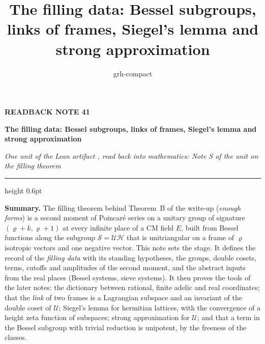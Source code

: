 \documentclass[11pt,a4paper]{article}
\title{The filling data: Bessel subgroups, links of frames, Siegel's lemma and strong approximation}
\author{grh-compact}
\date{}
\theoremstyle{plainx}
\theoremstyle{uprightx}
\begin{document}
\color{ink}

{\raggedright
{\sffamily\bfseries\fontsize{7.2}{9}\selectfont\color{leancol}READBACK NOTE 41\par}
\vspace{5pt}
{\fontsize{21.5}{25.5}\selectfont\bfseries The filling data: Bessel subgroups, links of frames, Siegel's lemma and strong
approximation\par}
\vspace{5pt}
{\fontsize{12.4}{16}\selectfont\itshape\color{inksoft} One unit of the Lean artifact \ArtifactName, read back into
mathematics: Note S of the unit on the filling theorem\par}}
\vspace{8pt}
{\color{rulegrey}\hrule height 0.6pt}
\vspace{7pt}
\thispagestyle{empty}

\textbf{Summary.} The filling theorem behind Theorem~B of the write-up (\emph{enough forms}) is a second moment of
Poincar\'e series on a unitary group of signature $(\varrho+k,\varrho+1)$ at every infinite place of a CM field $E$,
built from Bessel functions along the subgroup $\mathcal S=\mathcal U\mathcal H$ that is unitriangular on a frame
of $\varrho$ isotropic vectors and one negative vector. This note sets the stage. It defines the record of the
\emph{filling data} with its standing hypotheses, the groups, double cosets, terms, cutoffs and amplitudes of the
second moment, and the abstract inputs from the real places (Bessel systems, sieve systems). It then proves the
tools of the later notes: the dictionary between rational, finite adelic and real coordinates; that the \emph{link}
of two frames is a Lagrangian subspace and an invariant of the double coset of $\mathcal U$; Siegel's lemma for
hermitian lattices, with the convergence of a height zeta function of subspaces; strong approximation for
$\mathcal U$; and that a term in the Bessel subgroup with trivial reduction is unipotent, by the freeness of the
classes.
\end{document}
